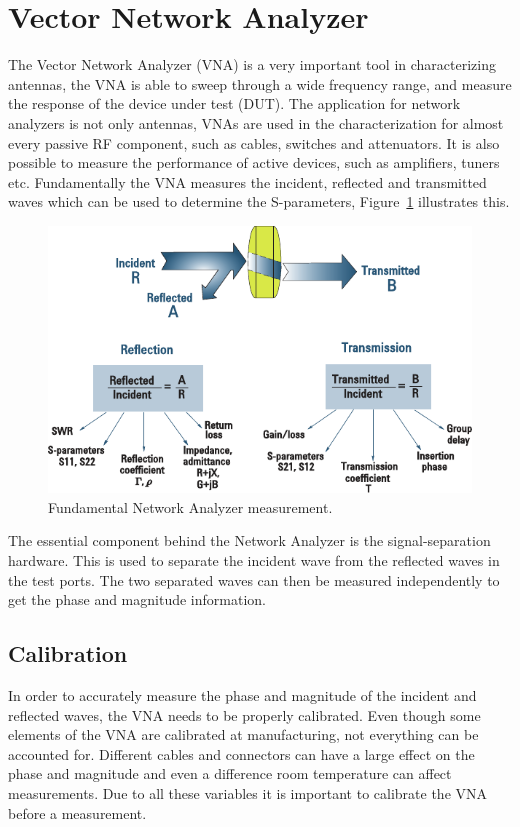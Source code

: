 \section{Vector Network Analyzer}
The Vector Network Analyzer (VNA) is a very important tool in characterizing antennas, the VNA is able to sweep through a wide frequency range, and measure the response of the device under test (DUT). The application for network analyzers is not only antennas, VNAs are used in the characterization for almost every passive RF component, such as cables, switches and attenuators\cite{nationalInstruVNA}. It is also possible to measure the performance of active devices, such as amplifiers, tuners etc. Fundamentally the VNA measures the incident, reflected and transmitted waves which can be used to determine the S-parameters\cite{nationalInstruVNA}, Figure~\ref{fig:vnaWaves} illustrates this. 


\begin{figure}[htbp]
    \centering
    \includegraphics{img/analysis/vnaWaves.pdf}
    \caption{Fundamental Network Analyzer measurement\cite{agilentAppNoteVNA}. }
    \label{fig:vnaWaves}
\end{figure}

The essential component behind the Network Analyzer is the signal-separation hardware. This is used to separate the incident wave from the reflected waves in the test ports. The two separated waves can then be measured independently to get the phase and magnitude information\cite{nationalInstruVNA}. 

\subsection{Calibration}
In order to accurately measure the phase and magnitude of the incident and reflected waves, the VNA needs to be properly calibrated. Even though some elements of the VNA are calibrated at manufacturing, not everything can be accounted for. Different cables and connectors can have a large effect on the phase and magnitude and even a difference room temperature can affect measurements\cite{nationalInstruVNA}. Due to all these variables it is important to calibrate the VNA before a measurement. 

